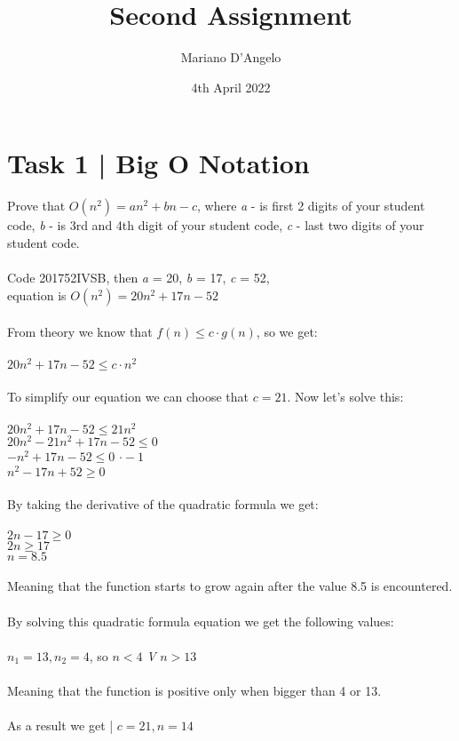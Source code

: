 \documentclass{article}
\title{Second Assignment}
\author{Mariano D'Angelo}
\date{4th April 2022}
\begin{document}
\maketitle

\section*{Task 1 | Big O Notation}
Prove that $O(n^2)= an^2 + bn - c$, where \textit{a} - is first 2 digits of your student
code, \textit{b} - is 3rd and 4th digit of your student code, \textit{c} - last 
two digits of your student code. \\\\
Code 201752IVSB, then \textit{a} = 20, \textit{b} = 17, \textit{c} = 52, \\
equation is $O(n^2) = 20n^2 + 17n - 52$ \\\\
From theory we know that $f(n) \le c \cdot g(n)$, so we get: \\\\
$20n^2 + 17n - 52 \le c \cdot n^2$ \\\\
To simplify our equation we can choose that $c = 21$. Now let's solve this:\\\\
$20n^2 + 17n - 52 \le 21n^2$ \\
$20n^2 - 21n^2 + 17n - 52 \le 0$ \\
$- n^2 + 17n - 52 \le 0$ \textbar{} $\cdot -1$\\
$n^2 - 17n + 52 \ge 0$ \\\\
By taking the derivative of the quadratic formula we get: \\\\
$2n - 17 \ge 0$ \\
$2n \ge 17$ \\
$n = 8.5$ \\\\
Meaning that the function starts to grow again after the value 8.5 is encountered. \\\\
By solving this quadratic formula equation we get the following values: \\\\
$n_1 = 13, n_2 = 4$, so $n < 4$ \textit{V} $n > 13$ \\\\
Meaning that the function is positive only when bigger than 4 or 13. \\\\
As a result we get | $c = 21, n = 14$
\end{document}
